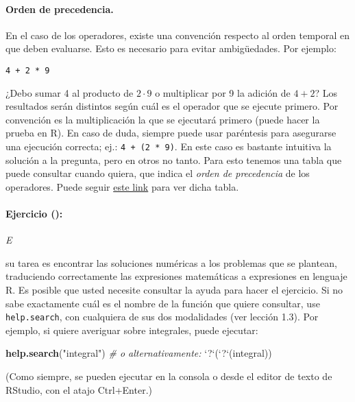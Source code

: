 \documentclass[]{article}
\newenvironment{Shaded}{}{}
\newcommand{\KeywordTok}[1]{\textcolor[rgb]{0.00,0.44,0.13}{\textbf{{#1}}}}
\newcommand{\DataTypeTok}[1]{\textcolor[rgb]{0.56,0.13,0.00}{{#1}}}
\newcommand{\StringTok}[1]{\textcolor[rgb]{0.25,0.44,0.63}{{#1}}}
\newcommand{\CommentTok}[1]{\textcolor[rgb]{0.38,0.63,0.69}{\textit{{#1}}}}
\newcommand{\NormalTok}[1]{{#1}}
\begin{document}
\paragraph{Orden de precedencia.}

En el caso de los operadores, existe una convención respecto al orden
temporal en que deben evaluarse. Esto es necesario para evitar
ambigüedades. Por ejemplo:

\begin{verbatim}
4 + 2 * 9
\end{verbatim}
¿Debo sumar 4 al producto de $2 \cdot 9$ o multiplicar por 9 la adición
de $4 + 2$? Los resultados serán distintos según cuál es el operador que
se ejecute primero. Por convención es la multiplicación la que se
ejecutará primero (puede hacer la prueba en R). En caso de duda, siempre
puede usar paréntesis para asegurarse una ejecución correcta; ej.:
\texttt{4 + (2 * 9)}. En este caso es bastante intuitiva la solución a
la pregunta, pero en otros no tanto. Para esto tenemos una tabla que
puede consultar cuando quiera, que indica el \emph{orden de precedencia}
de los operadores. Puede seguir
\href{https://www.dropbox.com/s/7a3q3xgax777zdq/2.0.1-orden-de-precedencia.pdf}{este
link} para ver dicha tabla.

\paragraph{Ejercicio ():}

\emph{E}

su tarea es encontrar las soluciones numéricas a los problemas que se
plantean, traduciendo correctamente las expresiones matemáticas a
expresiones en lenguaje R. Es posible que usted necesite consultar la
ayuda para hacer el ejercicio. Si no sabe exactamente cuál es el nombre
de la función que quiere consultar, use \texttt{help.search}, con
cualquiera de sus dos modalidades (ver lección 1.3). Por ejemplo, si
quiere averiguar sobre integrales, puede ejecutar:

\begin{Shaded}
\begin{Highlighting}[]
\KeywordTok{help.search}\NormalTok{(}\StringTok{"integral"}\NormalTok{)}
\CommentTok{# o alternativamente:}
\StringTok{`}\DataTypeTok{?}\StringTok{`}\NormalTok{(}\StringTok{`}\DataTypeTok{?}\StringTok{`}\NormalTok{(integral))}
\end{Highlighting}
\end{Shaded}
(Como siempre, se pueden ejecutar en la consola o desde el editor de
texto de RStudio, con el atajo Ctrl+Enter.)
\end{document}
